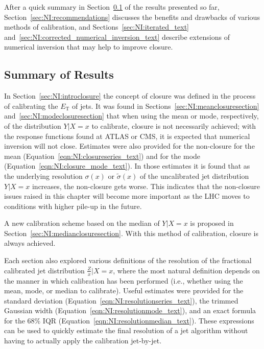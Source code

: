 After a quick summary in Section~\ref{sec:NI:summary} of the results presented so far, Section~\ref{sec:NI:recommendations} discusses the benefits and drawbacks of various methods of calibration, and Sections~\ref{sec:NI:iterated_text} and~\ref{sec:NI:corrected_numerical_inversion_text} describe extensions of numerical inversion that may help to improve closure.

\subsection{Summary of Results}
\label{sec:NI:summary}
In Section~\ref{sec:NI:introclosure} the concept of closure was defined in the process of calibrating the $E_\text{T}$ of jets.
It was found in Sections~\ref{sec:NI:meanclosuresection} and~\ref{sec:NI:modeclosuresection} that when using the mean or mode, respectively, of the distribution $Y|X=x$ to calibrate, closure is not necessarily achieved; with the response functions found at ATLAS or CMS, it is expected that numerical inversion will not close.
Estimates were also provided for the non-closure for the mean (Equation~\ref{eqn:NI:closureseries_text}) and for the mode (Equation~\ref{eqn:NI:closure_mode_text}).
In those estimates it is found that as the underlying resolution $\sigma(x)$ or $\tilde{\sigma}(x)$ of the uncalibrated jet distribution $Y|X=x$ increases, the non-closure gets worse.
This indicates that the non-closure issues raised in this chapter will become more important as the LHC moves to conditions with higher pile-up in the future.

\vspace{2mm}

A new calibration scheme based on the median of $Y|X=x$ is proposed in Section~\ref{sec:NI:medianclosuresection}.
With this method of calibration, closure is always achieved.

\vspace{2mm}

Each section also explored various definitions of the resolution of the fractional calibrated jet distribution $\frac{Z}{x}|X=x$, where the most natural definition depends on the manner in which calibration has been performed (i.e., whether using the mean, mode, or median to calibrate).
Useful estimates were provided for the standard deviation (Equation~\ref{eqn:NI:resolutionseries_text}), the trimmed Gaussian width (Equation~\ref{eqn:NI:resolutionmode_text}), and an exact formula for the 68\% IQR (Equation~\ref{eqn:NI:resolutionmedian_text}).
These expressions can be used to quickly estimate the final resolution of a jet algorithm without having to actually apply the calibration jet-by-jet.

